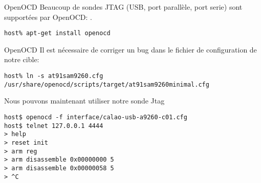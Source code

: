 \begin{frame}[fragile=singleslide]{OpenOCD}
  Beaucoup  de sondes  JTAG  (USB, port  parallèle,  port serie)  sont
  supportées                        par                       OpenOCD:
  .


  \begin{lstlisting}
host% apt-get install openocd
  \end{lstlisting}
\end{frame}


\begin{frame}[fragile=singleslide]{OpenOCD}
  Il  est   nécessaire  de  corriger   un  bug  dans  le   fichier  de
  configuration de notre cible:
  \begin{lstlisting}
host% ln -s at91sam9260.cfg /usr/share/openocd/scripts/target/at91sam9260minimal.cfg
  \end{lstlisting}
  Nous pouvons maintenant utiliser notre sonde Jtag
  \begin{lstlisting}
host$ openocd -f interface/calao-usb-a9260-c01.cfg
host$ telnet 127.0.0.1 4444
> help
> reset init
> arm reg
> arm disassemble 0x00000000 5
> arm disassemble 0x00000058 5
> ^C
  \end{lstlisting}
\end{frame}

